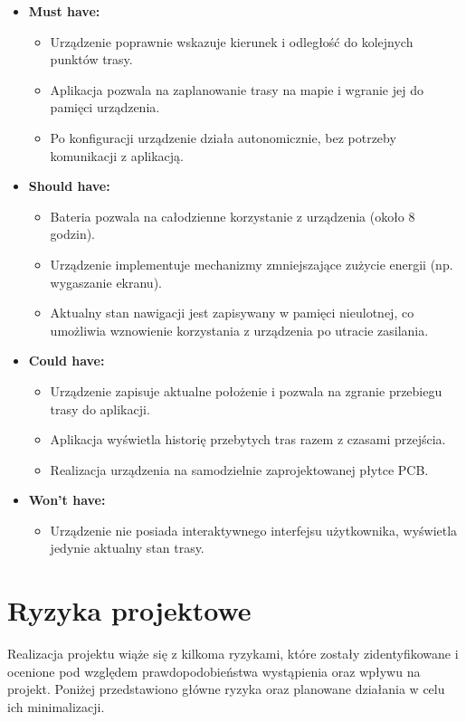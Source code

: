 \begin{itemize}
    \item \textbf{Must have:}
          \begin{itemize}
              \item Urządzenie poprawnie wskazuje kierunek i odległość do kolejnych punktów trasy.
              \item Aplikacja pozwala na zaplanowanie trasy na mapie i wgranie jej do pamięci urządzenia.
              \item Po konfiguracji urządzenie działa autonomicznie, bez potrzeby komunikacji z aplikacją.
          \end{itemize}
    \item \textbf{Should have:}
          \begin{itemize}
              \item Bateria pozwala na całodzienne korzystanie z urządzenia (około 8 godzin).
              \item Urządzenie implementuje mechanizmy zmniejszające zużycie energii (np. wygaszanie ekranu).
              \item Aktualny stan nawigacji jest zapisywany w pamięci nieulotnej, co umożliwia wznowienie korzystania z urządzenia po utracie zasilania.
          \end{itemize}
    \item \textbf{Could have:}
          \begin{itemize}
              \item Urządzenie zapisuje aktualne położenie i pozwala na zgranie przebiegu trasy do aplikacji.
              \item Aplikacja wyświetla historię przebytych tras razem z czasami przejścia.
              \item Realizacja urządzenia na samodzielnie zaprojektowanej płytce PCB.
          \end{itemize}
    \item \textbf{Won't have:}
          \begin{itemize}
              \item Urządzenie nie posiada interaktywnego interfejsu użytkownika, wyświetla jedynie aktualny stan trasy.
          \end{itemize}
\end{itemize}

\section{Ryzyka projektowe}
Realizacja projektu wiąże się z kilkoma ryzykami, które zostały zidentyfikowane i ocenione pod względem prawdopodobieństwa wystąpienia oraz wpływu na projekt. Poniżej przedstawiono główne ryzyka oraz planowane działania w celu ich minimalizacji.

